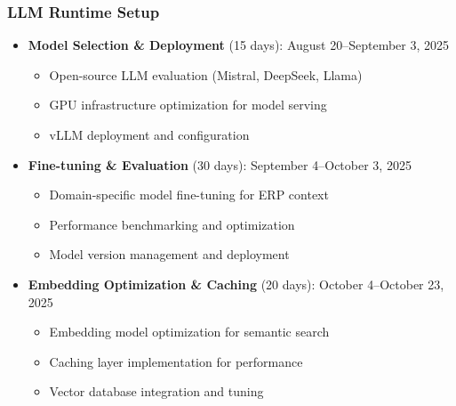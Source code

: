 \documentclass[12pt]{report}
\begin{document}
\subsubsection{LLM Runtime Setup}
\begin{itemize}
  \item \textbf{Model Selection \& Deployment} (15 days): August 20--September 3, 2025
    \begin{itemize}
      \item Open-source LLM evaluation (Mistral, DeepSeek, Llama)
      \item GPU infrastructure optimization for model serving
      \item vLLM deployment and configuration
    \end{itemize}
  \item \textbf{Fine-tuning \& Evaluation} (30 days): September 4--October 3, 2025
    \begin{itemize}
      \item Domain-specific model fine-tuning for ERP context
      \item Performance benchmarking and optimization
      \item Model version management and deployment
    \end{itemize}
  \item \textbf{Embedding Optimization \& Caching} (20 days): October 4--October 23, 2025
    \begin{itemize}
      \item Embedding model optimization for semantic search
      \item Caching layer implementation for performance
      \item Vector database integration and tuning
    \end{itemize}
\end{itemize}
\end{document}
